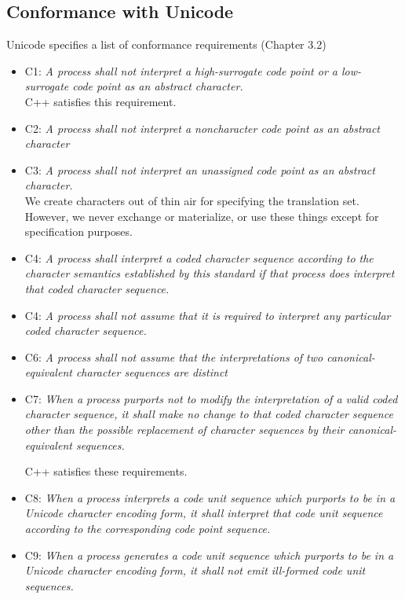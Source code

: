 \documentclass{wg21}
\begin{document}
\subsection{Conformance with Unicode}

Unicode specifies a list of conformance requirements (Chapter 3.2)

\begin{itemize}
    \item C1: \emph{A process shall not interpret a high-surrogate code point or a low-surrogate code point as an abstract character.}\\
    C++ satisfies this requirement.

    \item C2: \emph{A process shall not interpret a noncharacter code point as an abstract character}
    \item C3: \emph{A process shall not interpret an unassigned code point as an abstract character.}\\

    We create characters out of thin air for specifying the translation set.
    However, we never exchange or materialize, or use these things except for specification purposes.

    \item C4: \emph{A process shall interpret a coded character sequence according to the character semantics established by this standard if that process does interpret that coded character sequence.}
    \item C4: \emph{A process shall not assume that it is required to interpret any particular coded character sequence.}
    \item C6: \emph{A process shall not assume that the interpretations of two canonical-equivalent character sequences are distinct}
    \item C7: \emph{When a process purports not to modify the interpretation of a valid coded character
        sequence, it shall make no change to that coded character sequence other than the possible replacement of character sequences by their canonical-equivalent sequences.}

    C++ satisfies these requirements.

    \item C8: \emph{When a process interprets a code unit sequence which purports to be in a Unicode
        character encoding form, it shall interpret that code unit sequence according to the
        corresponding code point sequence.}
    \item C9: \emph{When a process generates a code unit sequence which purports to be in a Unicode
        character encoding form, it shall not emit ill-formed code unit sequences.}


\end{itemize}
\end{document}
